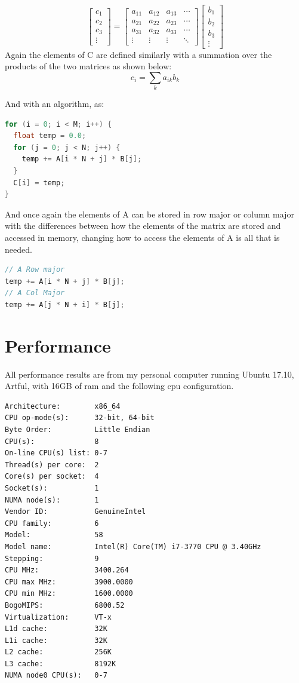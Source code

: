 \documentclass[a4paper]{article}
\begin{document}
\[
\begin{bmatrix}
    c_{1} \\
    c_{2} \\
    c_{3} \\
    \vdots  
\end{bmatrix} 
=
\begin{bmatrix}
    a_{11}  &  a_{12} & a_{13} & \cdots  \\
    a_{21}  &  a_{22} & a_{23} & \cdots  \\
    a_{31}  &  a_{32} & a_{33} & \cdots  \\
    \vdots & \vdots & \vdots & \ddots 
\end{bmatrix}
\begin{bmatrix}
    b_{1}  \\
    b_{2}  \\
    b_{3}  \\
    \vdots
\end{bmatrix}
\]
Again the elements of C are defined similarly with a summation over the products of the two matrices as shown below:
\begin{equation*}
c_{i} = \sum_{k} a_{ik}b_{k}
\end{equation*}

And with an algorithm, as:

\begin{lstlisting}[language=C++]
for (i = 0; i < M; i++) {
  float temp = 0.0;
  for (j = 0; j < N; j++) {
    temp += A[i * N + j] * B[j];
  }
  C[i] = temp;
}
\end{lstlisting}

And once again the elements of A can be stored in row major or column major with the differences between how the elements of the matrix are stored and accessed in memory, changing how to access the elements of A is all that is needed.

\begin{lstlisting}[language=C++]
// A Row major
temp += A[i * N + j] * B[j];
// A Col Major
temp += A[j * N + i] * B[j];
\end{lstlisting}

\pagebreak
\section*{Performance}
All performance results are from my personal computer running Ubuntu 17.10, Artful, with 16GB of ram and the following cpu configuration.

\begin{verbatim}
Architecture:        x86_64
CPU op-mode(s):      32-bit, 64-bit
Byte Order:          Little Endian
CPU(s):              8
On-line CPU(s) list: 0-7
Thread(s) per core:  2
Core(s) per socket:  4
Socket(s):           1
NUMA node(s):        1
Vendor ID:           GenuineIntel
CPU family:          6
Model:               58
Model name:          Intel(R) Core(TM) i7-3770 CPU @ 3.40GHz
Stepping:            9
CPU MHz:             3400.264
CPU max MHz:         3900.0000
CPU min MHz:         1600.0000
BogoMIPS:            6800.52
Virtualization:      VT-x
L1d cache:           32K
L1i cache:           32K
L2 cache:            256K
L3 cache:            8192K
NUMA node0 CPU(s):   0-7
\end{verbatim}
\end{document}
